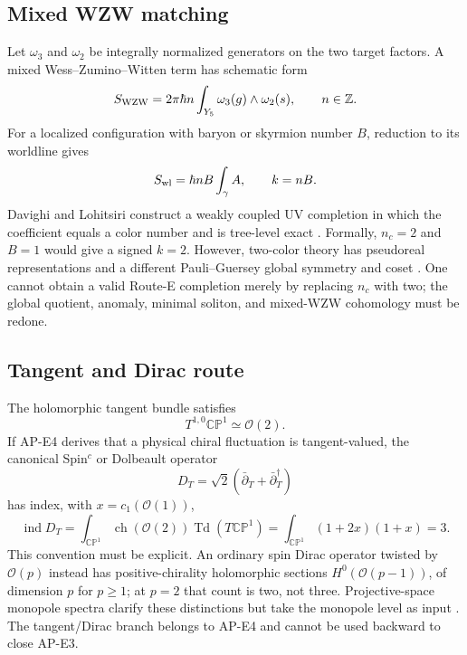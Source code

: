 \documentclass[11pt]{article}
\theoremstyle{definition}
\theoremstyle{remark}
\newcommand{\CP}{\mathbb{CP}}
\newcommand{\cO}{\mathcal O}
\begin{document}
\subsection{Mixed WZW matching}

Let \(\omega_3\) and \(\omega_2\) be integrally normalized generators on the
two target factors.  A mixed Wess--Zumino--Witten term has schematic form
\begin{equation}
 S_{\rm WZW}=2\pi\hbar n\int_{Y_5}\omega_3(g)\wedge\omega_2(s),
 \qquad n\in\mathbb Z.
 \label{eq:mixed-wzw}
\end{equation}
For a localized configuration with baryon or skyrmion number \(B\), reduction
to its worldline gives
\begin{equation}
 S_{\rm wl}=\hbar nB\int_\gamma A,\qquad k=nB.
 \label{eq:wzw-reduction}
\end{equation}
Davighi and Lohitsiri construct a weakly coupled UV completion in which the
coefficient equals a color number and is tree-level exact
\cite{DavighiLohitsiri2024}.  Formally, \(n_c=2\) and \(B=1\) would give a
signed \(k=2\).  However, two-color theory has pseudoreal representations and a
different Pauli--Guersey global symmetry and coset
\cite{SuenagaEtAl2023}.  One cannot obtain a valid Route-E completion merely
by replacing \(n_c\) with two; the global quotient, anomaly, minimal soliton,
and mixed-WZW cohomology must be redone.

\subsection{Tangent and Dirac route}

The holomorphic tangent bundle satisfies
\begin{equation}
 T^{1,0}\CP^1\simeq\cO(2).
\end{equation}
If AP-E4 derives that a physical chiral fluctuation is tangent-valued, the
canonical Spin\({}^c\) or Dolbeault operator
\begin{equation}
 D_T=\sqrt2(\bar\partial_T+\bar\partial_T^\dagger)
\end{equation}
has index, with \(x=c_1(\cO(1))\),
\begin{equation}
 \operatorname{ind}D_T
 =\int_{\CP^1}\operatorname{ch}(\cO(2))\operatorname{Td}(T\CP^1)
 =\int_{\CP^1}(1+2x)(1+x)=3.
 \label{eq:dolbeault-index}
\end{equation}
This convention must be explicit.  An ordinary spin Dirac operator twisted
by \(\cO(p)\) instead has positive-chirality holomorphic sections
\(H^0(\cO(p-1))\), of dimension \(p\) for \(p\ge1\); at \(p=2\) that count is
two, not three.  Projective-space monopole spectra clarify these distinctions
but take the monopole level as input \cite{BykovSmilga2023APE3}.  The
tangent/Dirac branch belongs to AP-E4 and cannot be used backward to close
AP-E3.
\end{document}
